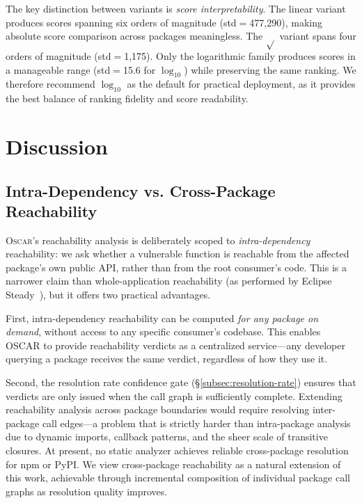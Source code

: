 \documentclass[conference]{IEEEtran}
\begin{document}
The key distinction between variants is \emph{score interpretability}. The linear variant produces scores spanning six orders of magnitude (std$=$477{,}290), making absolute score comparison across packages meaningless. The $\sqrt{}$ variant spans four orders of magnitude (std$=$1{,}175). Only the logarithmic family produces scores in a manageable range (std$=$15.6 for $\log_{10}$) while preserving the same ranking. We therefore recommend $\log_{10}$ as the default for practical deployment, as it provides the best balance of ranking fidelity and score readability.

\section{Discussion}
\label{sec:discussion}

\subsection{Intra-Dependency vs. Cross-Package Reachability}
\label{subsec:reachability-scope}

\textsc{Oscar}'s reachability analysis is deliberately scoped to \emph{intra-dependency} reachability: we ask whether a vulnerable function is reachable from the affected package's own public API, rather than from the root consumer's code. This is a narrower claim than whole-application reachability (as performed by Eclipse Steady~\cite{plate2015eclipsesteady}), but it offers two practical advantages.

First, intra-dependency reachability can be computed \emph{for any package on demand}, without access to any specific consumer's codebase. This enables OSCAR to provide reachability verdicts as a centralized service—any developer querying a package receives the same verdict, regardless of how they use it.

Second, the resolution rate confidence gate (§\ref{subsec:resolution-rate}) ensures that verdicts are only issued when the call graph is sufficiently complete. Extending reachability analysis across package boundaries would require resolving inter-package call edges—a problem that is strictly harder than intra-package analysis due to dynamic imports, callback patterns, and the sheer scale of transitive closures. At present, no static analyzer achieves reliable cross-package resolution for npm or PyPI. We view cross-package reachability as a natural extension of this work, achievable through incremental composition of individual package call graphs as resolution quality improves.
\end{document}
